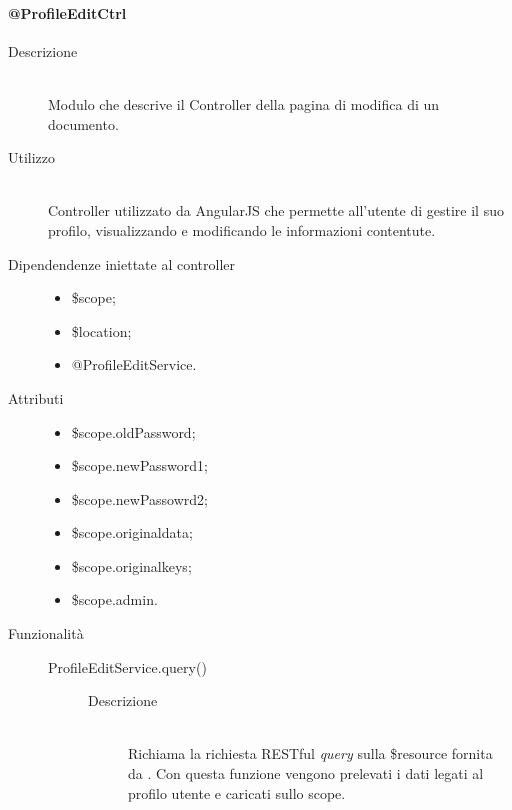 \paragraph{@ProfileEditCtrl}
\begin{description}
 \item[Descrizione] \hfill \\
 Modulo che descrive il Controller della pagina di modifica di un documento.
 
 \item[Utilizzo] \hfill \\
 Controller utilizzato da AngularJS che permette all'utente di gestire il suo profilo, visualizzando e modificando le informazioni contentute.\\ 
 \item[Dipendendenze iniettate al controller] \hfill
 \begin{itemize}
  \item \$scope;
  \item \$location;
  \item @ProfileEditService.
  
 \end{itemize}
 
 \item[Attributi] \hfill
 \begin{itemize}
 \item \$scope.oldPassword;
 \item \$scope.newPassword1;
 \item \$scope.newPassowrd2;
 \item \$scope.original\textunderscore data;
 \item \$scope.original\textunderscore keys;
 \item \$scope.admin.
 \end{itemize}
 
 \item[Funzionalità] \hfill
 \begin{description}
  \item[ProfileEditService.query()] \hfill
  \begin{description}
  	\item[Descrizione] \hfill \\
   Richiama la richiesta RESTful \textit{query} sulla \$resource fornita da .
  Con questa funzione vengono prelevati i dati legati al profilo utente e caricati sullo scope.
	 
  \end{description}


\end{description}
\end{description}
